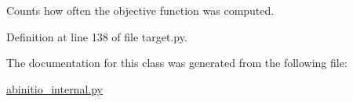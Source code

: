 Counts how often the objective function was computed. 



Definition at line 138 of file target.\-py.



The documentation for this class was generated from the following file\-:\begin{DoxyCompactItemize}
\item 
\hyperlink{abinitio__internal_8py}{abinitio\-\_\-internal.\-py}\end{DoxyCompactItemize}
